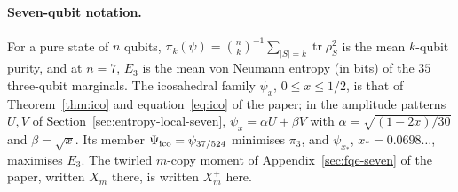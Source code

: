 \documentclass[11pt]{article}
\numberwithin{equation}{section}
\begin{document}
\paragraph{Seven-qubit notation.} For a pure state of $n$ qubits, $\pi_k(\psi)=\binom nk^{-1}\sum_{|S|=k}\operatorname{tr}\rho_S^2$
is the mean $k$-qubit purity, and at $n=7$, $E_3$ is the mean von Neumann entropy (in bits) of the $35$ three-qubit marginals.
The icosahedral family $\psi_x$, $0\le x\le1/2$, is that of Theorem~\ref{thm:ico} and equation~\eqref{eq:ico} of the paper;
in the amplitude patterns $U,V$ of Section~\ref{sec:entropy-local-seven}, $\psi_x=\alpha U+\beta V$ with $\alpha=\sqrt{(1-2x)/30}$ and $\beta=\sqrt x$. Its
member $\Psi_{\mathrm{ico}}=\psi_{37/524}$ minimises $\pi_3$, and $\psi_{x_*}$, $x_*=0.0698\ldots$, maximises $E_3$. The twirled $m$-copy
moment of Appendix~\ref{sec:fqe-seven} of the paper, written $X_m$ there, is written $X_m^+$ here.











\end{document}
